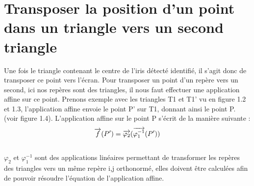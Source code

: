 \documentclass[a4paper, 12pt]{report}
\begin{document}
	\section{Transposer la position d'un point dans un triangle vers un second triangle}
	Une fois le triangle contenant le centre de l'iris détecté identifié, il s'agit donc de transposer ce point vers l'écran. Pour transposer un point d'un repère vers un second, ici nos repères sont des triangles, il nous faut effectuer une application affine sur ce point\cite{c2}. Prenons exemple avec les triangles T1 et T1' vu en figure 1.2 et 1.3, l'application affine envoie le point P' sur T1, donnant ainsi le point P. (voir figure 1.4). L'application affine sur le point P s'écrit de la manière suivante : \\
	$$
	\overrightarrow{f}(P') = \overrightarrow{\varphi _{2}} (\overrightarrow{\varphi _{1}^{-1}}(P'))\\
	$$
		\\
$\varphi _{2}$ et $\varphi _{1}^{-1}$ sont des applications linéaires permettant de transformer les repères des triangles vers un même repère i,j orthonormé, elles doivent être calculées afin de pouvoir résoudre l'équation de l'application affine.
\end{document}
